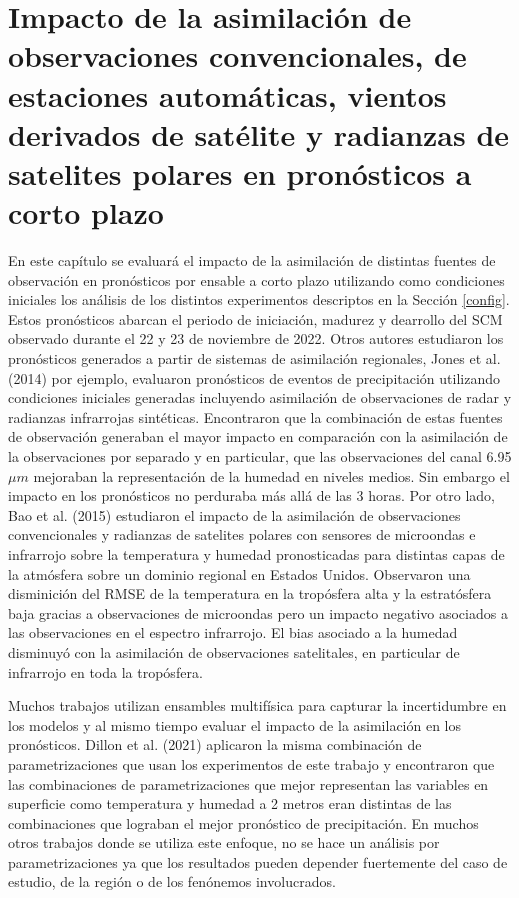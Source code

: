 \documentclass[12pt,oneside,a4paper]{reedthesis}
\begin{document}
\hypertarget{impacto-de-la-asimilaciuxf3n-de-observaciones-convencionales-de-estaciones-automuxe1ticas-vientos-derivados-de-satuxe9lite-y-radianzas-de-satelites-polares-en-pronuxf3sticos-a-corto-plazo}{%
\chapter{Impacto de la asimilación de observaciones convencionales, de estaciones automáticas, vientos derivados de satélite y radianzas de satelites polares en pronósticos a corto plazo}\label{impacto-de-la-asimilaciuxf3n-de-observaciones-convencionales-de-estaciones-automuxe1ticas-vientos-derivados-de-satuxe9lite-y-radianzas-de-satelites-polares-en-pronuxf3sticos-a-corto-plazo}}

En este capítulo se evaluará el impacto de la asimilación de distintas fuentes de observación en pronósticos por ensable a corto plazo utilizando como condiciones iniciales los análisis de los distintos experimentos descriptos en la Sección \ref{config}. Estos pronósticos abarcan el periodo de iniciación, madurez y dearrollo del SCM observado durante el 22 y 23 de noviembre de 2022. Otros autores estudiaron los pronósticos generados a partir de sistemas de asimilación regionales, Jones et al. (2014) por ejemplo, evaluaron pronósticos de eventos de precipitación utilizando condiciones iniciales generadas incluyendo asimilación de observaciones de radar y radianzas infrarrojas sintéticas. Encontraron que la combinación de estas fuentes de observación generaban el mayor impacto en comparación con la asimilación de la observaciones por separado y en particular, que las observaciones del canal 6.95 \(\mu m\) mejoraban la representación de la humedad en niveles medios. Sin embargo el impacto en los pronósticos no perduraba más allá de las 3 horas. Por otro lado, Bao et al. (2015) estudiaron el impacto de la asimilación de observaciones convencionales y radianzas de satelites polares con sensores de microondas e infrarrojo sobre la temperatura y humedad pronosticadas para distintas capas de la atmósfera sobre un dominio regional en Estados Unidos. Observaron una disminición del RMSE de la temperatura en la tropósfera alta y la estratósfera baja gracias a observaciones de microondas pero un impacto negativo asociados a las observaciones en el espectro infrarrojo. El bias asociado a la humedad disminuyó con la asimilación de observaciones satelitales, en particular de infrarrojo en toda la tropósfera.

Muchos trabajos utilizan ensambles multifísica para capturar la incertidumbre en los modelos y al mismo tiempo evaluar el impacto de la asimilación en los pronósticos. Dillon et al. (2021) aplicaron la misma combinación de parametrizaciones que usan los experimentos de este trabajo y encontraron que las combinaciones de parametrizaciones que mejor representan las variables en superficie como temperatura y humedad a 2 metros eran distintas de las combinaciones que lograban el mejor pronóstico de precipitación. En muchos otros trabajos donde se utiliza este enfoque, no se hace un análisis por parametrizaciones ya que los resultados pueden depender fuertemente del caso de estudio, de la región o de los fenónemos involucrados.
\end{document}
